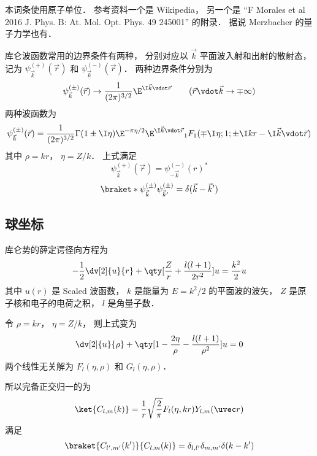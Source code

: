 
本词条使用原子单位． 参考资料一个是 Wikipedia， 另一个是 “F Morales et al 2016 J. Phys. B: At. Mol. Opt. Phys. 49 245001” 的附录． 据说 Merzbacher 的量子力学也有．

库仑波函数常用的边界条件有两种， 分别对应以 $\vec k$ 平面波入射和出射的散射态， 记为 $\psi_{\vec k}^{(+)}(\vec r)$ 和 $\psi_{\vec k}^{(-)}(\vec r)$． 两种边界条件分别为
\begin{equation}
\psi_{\vec k}^{(\pm)}(\vec r) \to \frac{1}{(2\pi)^{3/2}} \E^{\I\vec k\vdot\vec r}
\qquad
(\vec r\vdot \vec k \to \mp\infty)
\end{equation}
两种波函数为
\begin{equation}
\psi_{\vec k}^{(\pm)}(\vec r) = \frac{1}{(2\pi)^{3/2}} \Gamma(1\pm \I\eta)\E^{-\pi\eta/2} \E^{\I\vec k\vdot\vec r} {_1F_1}(\mp\I\eta; 1; \pm\I kr - \I \vec k\vdot \vec r)
\end{equation}
其中 $\rho = kr$， $\eta = Z/k$． 上式满足
\begin{equation}
\psi_{\vec k}^{(+)}(\vec r) = \psi_{-\vec k}^{(-)}(r)^*
\end{equation}
\begin{equation}
\braket*{\psi_{\vec k}^{(\pm)}}{\psi_{\vec k'}^{(\pm)}} = \delta(\vec k - \vec k')
\end{equation}

\subsection{球坐标}
库仑势的薛定谔径向方程为
\begin{equation}
-\frac12 \dv[2]{u}{r} + \qty[\frac{Z}{r} + \frac{l(l+1)}{2 r^2}]u = \frac{k^2}{2}u
\end{equation}
其中 $u(r)$ 是 Scaled 波函数， $k$ 是能量为 $E = k^2/2$ 的平面波的波矢， $Z$ 是原子核和电子的电荷之积， $l$ 是角量子数．

令 $\rho = kr$， $\eta = Z/k$， 则上式变为
\begin{equation}
\dv[2]{u}{\rho} + \qty[1 - \frac{2\eta}{\rho} - \frac{l(l+1)}{\rho^2}]u = 0
\end{equation}
两个线性无关解为 $F_l(\eta, \rho)$ 和 $G_l(\eta, \rho)$．

所以完备正交归一的为
\begin{equation}
\ket{C_{l,m}(k)} = \frac{1}{r} \sqrt{\frac{2}{\pi}} F_l(\eta, kr) Y_{l,m}(\uvec r)
\end{equation}
满足
\begin{equation}
\braket{C_{l',m'}(k')}{C_{l,m}(k)} = \delta_{l,l'}\delta_{m,m'}\delta(k-k')
\end{equation}

